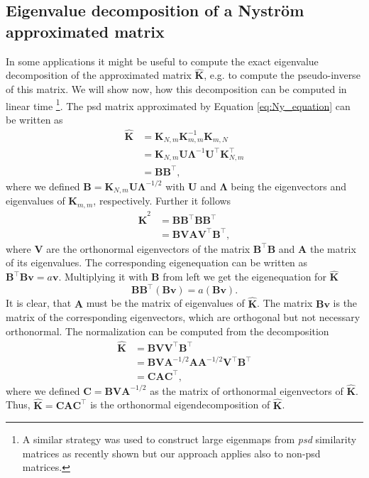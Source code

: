 \documentclass[twoside,11pt]{article}
\begin{document}
\subsection{Eigenvalue decomposition of a Nystr\"om approximated matrix}\label{sec:eval_decomp}
In some applications it might be useful to compute the exact eigenvalue decomposition
of the approximated matrix $\mathbf{\hat{K}}$,
e.g. to compute the pseudo-inverse of this matrix.
We will show now, how this decomposition can be computed in linear time
\footnote{A similar strategy was used to construct large eigenmaps from \emph{psd} similarity matrices 
as recently shown \cite{JMLR:v14:talwalkar13a} but our approach applies also to non-psd matrices.}.
The psd matrix approximated by Equation \eqref{eq:Ny_equation} 
can be written as
\begin{align*}
\mathbf{\hat{K}} & = \mathbf{K}_{N,m} \mathbf{K}^{-1}_{m,m} \mathbf{K}_{m,N}\\
& = \mathbf{K}_{N,m} \mathbf{U} \mathbf{\Lambda}^{-1}
  \mathbf{U}^\top \mathbf{K}_{N,m}^\top\\
& = \mathbf{B} \mathbf{B}^\top,
\end{align*}
where we defined $\mathbf{B}=\mathbf{K}_{N,m} \mathbf{U} \mathbf{\Lambda}^{-1/2}$
with $\mathbf{U}$ and $\mathbf{\Lambda}$ being the eigenvectors and eigenvalues
of $\mathbf{K}_{m,m}$, respectively.
Further it follows
\begin{align*}
\mathbf{\hat{K}}^2 & = \mathbf{B} \mathbf{B}^\top \mathbf{B} \mathbf{B}^\top\\
& = \mathbf{B} \mathbf{V} \mathbf{A} \mathbf{V}^\top \mathbf{B}^\top,
\end{align*}
where $\mathbf{V}$ are the orthonormal eigenvectors of the matrix 
$\mathbf{B}^\top \mathbf{B}$
and $\mathbf{A}$ the matrix of its eigenvalues.
The corresponding eigenequation can be written as
$
\mathbf{B}^\top \mathbf{B} \mathbf{v} = a \mathbf{v}.
$
Multiplying it with $\mathbf{B}$ from left
we get the eigenequation for $\mathbf{\hat{K}}$
\[
\mathbf{B} \mathbf{B}^\top (\mathbf{B} \mathbf{v})
= a \left( \mathbf{B} \mathbf{v} \right).
\]
It is clear, that $\mathbf{A}$ must be the matrix of eigenvalues of $\mathbf{\hat{K}}$.
The matrix $\mathbf{B} \mathbf{v}$ is the matrix of the corresponding eigenvectors,
which are orthogonal but not necessary orthonormal.
The normalization can be computed from the decomposition
\begin{align*}
\mathbf{\hat{K}} & = \mathbf{B} \mathbf{V} \mathbf{V}^\top \mathbf{B}^\top\\
& = \mathbf{B} \mathbf{V} \mathbf{A}^{-1/2} \mathbf{A}
  \mathbf{A}^{-1/2} \mathbf{V}^\top \mathbf{B}^\top\\
& = \mathbf{C} \mathbf{A} \mathbf{C}^\top,
\end{align*}
where we defined $\mathbf{C} = \mathbf{B} \mathbf{V} \mathbf{A}^{-1/2}$
as the matrix of orthonormal eigenvectors of $\mathbf{\hat{K}}$.
Thus,
$
\mathbf{\hat{K}} = \mathbf{C} \mathbf{A} \mathbf{C}^\top
$
is the orthonormal eigendecomposition of $\mathbf{\hat{K}}$.
\end{document}
